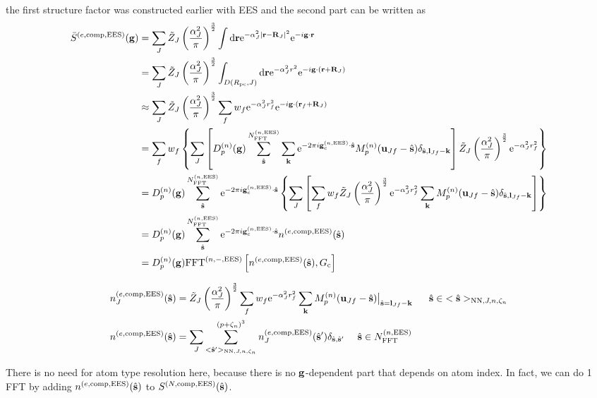 \documentclass[paper=a4, fontsize=11pt]{article} %
\numberwithin{equation}{section} %
\numberwithin{figure}{section} %
\numberwithin{table}{section} %
\newcommand{\bu}{{\bf{u}}}
\newcommand{\bl}{{\bf{l}}}
\newcommand{\bk}{{\bf{k}}}
\newcommand{\bs}{{\bf{s}}}
\newcommand{\bg}{{\bf{g}}}
\newcommand{\br}{{\bf{r}}}
\newcommand{\bR}{{\bf{R}}}
\newcommand{\hs}{{\hat{\bf{s}}}}
\newcommand{\rEES}{{\mathrm{EES}}}
\newcommand{\rNN}{{\mathrm{NN}}}
\newcommand{\re}{{\mathrm{e}}}
\newcommand{\rd}{{\mathrm{d}}}
\newcommand{\rcomp}{{\mathrm{comp}}}
\newcommand{\ibgr}{i\bg\cdot\br}
\newcommand{\gcnEES}{{\bg_c^{(n,\rEES)}}}
\newcommand{\al}{{\alpha}}
\newcommand{\NFFTnEES}{{N^{(n,\rEES)}_{\mathrm{FFT}}}}
\newcommand{\Gc}{{G_{\mathrm{c}}}}
\newcommand{\Rpc}{{R_{\mathrm{pc}}}}
\newcommand{\Dng}{{D^{(n)}_p(\bg)}}
\newcommand{\FFTniEES}{{\mathrm{FFT}^{(n,-,\rEES)}}}
\newcommand{\pzn}{{(p+\zeta_n)^3}}
\newcommand{\hsJn}{{<\hs>_{\rNN,J,n,\zeta_n}}}
\newcommand{\hsinJn}{{\ \ \ \ \ \hs  \in  \hsJn}}
\newcommand{\hspJn}{{<\hs'>_{\rNN,J,n,\zeta_n}}}
\newcommand{\hsinnEES}{{\ \ \ \ \hs \in \NFFTnEES}}
\begin{document}
the first structure factor was constructed earlier with EES and the second part can be written as
\begin{equation}
\begin{split}
\bar S^{(e,\rcomp,\rEES)}(\bg)
&=  \sum_J \tilde Z_J \left(\frac{\al_J^2}{\pi}\right)^{\frac{3}{2}} \int \rd \br \re^{-\al_J^2|\br-\bR_J|^2} \re^{-\ibgr}\\
&=  \sum_J \tilde Z_J \left(\frac{\al_J^2}{\pi}\right)^{\frac{3}{2}} \int_{D(\Rpc,J)} \rd \br \re^{-\al_J^2 r^2} \re^{-i\bg\cdot\left(\br+\bR_J\right)}\\
&\approx \sum_J \tilde Z_J \left(\frac{\al_J^2}{\pi}\right)^{\frac{3}{2}} \sum_f w_f \re^{-\al_J^2 r_f^2} \re^{-i\bg\cdot\left(\br_f+\bR_J\right)}\\
&=  \sum_f w_f \left\{\sum_J \left[\Dng\sum_{\hs}^{\NFFTnEES} \sum_{\bk} \re^{-2\pi i\gcnEES \cdot \hs} M_p^{(n)}(\bu_{Jf}-\hs)\delta_{\hat \bs,\bl_{Jf}-\bk}\right]  \tilde Z_J \left(\frac{\al_J^2}{\pi}\right)^{\frac{3}{2}} \re^{-\al_J^2 r_f^2} \right\} \\
 &= D_p^{(n)}(\bg)\sum_{\hat \bs}^{\NFFTnEES} \re^{-2\pi i\gcnEES \cdot \hat\bs}\left\{\sum_J \left[ \sum_f w_f \tilde Z_J \left(\frac{\al_J^2}{\pi}\right)^{\frac{3}{2}} \re^{-\al_J^2 r_f^2} \sum_{\bk}  M_p^{(n)}(\bu_{Jf}-\hat \bs)\delta_{\hat \bs,\bl_{Jf}-\bk}\right] \right\}\\
 &= D_p^{(n)}(\bg)\sum_{\hat \bs}^{\NFFTnEES} \re^{-2\pi i\gcnEES \cdot \hat\bs} n^{(e,\rcomp,\rEES)}(\hs)\\
 &= \Dng \FFTniEES \left[ n^{(e,\rcomp,\rEES)}(\hs), \Gc \right]\\
\end{split}
\end{equation}

\begin{equation}
\begin{split}
n_J^{(e,\rcomp,\rEES)}(\hs) &=\tilde Z_J \left(\frac{\al_J^2}{\pi}\right)^{\frac{3}{2}}\sum_f w_f  \re^{-\al_J^2 r_f^2}\sum_{\bk}  M_p^{(n)}(\bu_{Jf}-\hat \bs)\big|_{\hs=\bl_{Jf}-\bk} \hsinJn\\
n^{(e,\rcomp,\rEES)}(\hs) &= \sum_J \sum_{\hspJn}^{\pzn} n_J^{(e,\rcomp,\rEES)}(\hs') \delta_{\hs,\hs'} \hsinnEES\\
\end{split}
\end{equation}

There is no need for atom type resolution here, because there is no $\bg$-dependent part that depends on atom index. In fact, we can do 1 FFT by adding $n^{(e,\rcomp,\rEES)}(\hs)$ to $S^{(N,\rcomp,\rEES)}(\hs)$.
\end{document}
